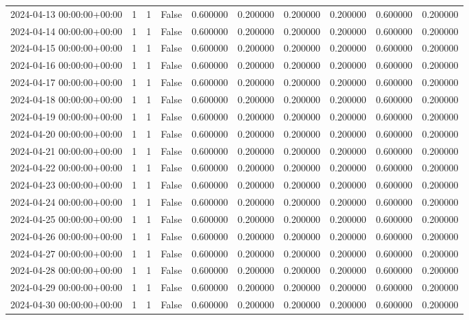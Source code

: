 \begin{tabular}{lrrrrrrrrr}
2024-04-13 00:00:00+00:00 & 1 & 1 & False & 0.600000 & 0.200000 & 0.200000 & 0.200000 & 0.600000 & 0.200000 \\
2024-04-14 00:00:00+00:00 & 1 & 1 & False & 0.600000 & 0.200000 & 0.200000 & 0.200000 & 0.600000 & 0.200000 \\
2024-04-15 00:00:00+00:00 & 1 & 1 & False & 0.600000 & 0.200000 & 0.200000 & 0.200000 & 0.600000 & 0.200000 \\
2024-04-16 00:00:00+00:00 & 1 & 1 & False & 0.600000 & 0.200000 & 0.200000 & 0.200000 & 0.600000 & 0.200000 \\
2024-04-17 00:00:00+00:00 & 1 & 1 & False & 0.600000 & 0.200000 & 0.200000 & 0.200000 & 0.600000 & 0.200000 \\
2024-04-18 00:00:00+00:00 & 1 & 1 & False & 0.600000 & 0.200000 & 0.200000 & 0.200000 & 0.600000 & 0.200000 \\
2024-04-19 00:00:00+00:00 & 1 & 1 & False & 0.600000 & 0.200000 & 0.200000 & 0.200000 & 0.600000 & 0.200000 \\
2024-04-20 00:00:00+00:00 & 1 & 1 & False & 0.600000 & 0.200000 & 0.200000 & 0.200000 & 0.600000 & 0.200000 \\
2024-04-21 00:00:00+00:00 & 1 & 1 & False & 0.600000 & 0.200000 & 0.200000 & 0.200000 & 0.600000 & 0.200000 \\
2024-04-22 00:00:00+00:00 & 1 & 1 & False & 0.600000 & 0.200000 & 0.200000 & 0.200000 & 0.600000 & 0.200000 \\
2024-04-23 00:00:00+00:00 & 1 & 1 & False & 0.600000 & 0.200000 & 0.200000 & 0.200000 & 0.600000 & 0.200000 \\
2024-04-24 00:00:00+00:00 & 1 & 1 & False & 0.600000 & 0.200000 & 0.200000 & 0.200000 & 0.600000 & 0.200000 \\
2024-04-25 00:00:00+00:00 & 1 & 1 & False & 0.600000 & 0.200000 & 0.200000 & 0.200000 & 0.600000 & 0.200000 \\
2024-04-26 00:00:00+00:00 & 1 & 1 & False & 0.600000 & 0.200000 & 0.200000 & 0.200000 & 0.600000 & 0.200000 \\
2024-04-27 00:00:00+00:00 & 1 & 1 & False & 0.600000 & 0.200000 & 0.200000 & 0.200000 & 0.600000 & 0.200000 \\
2024-04-28 00:00:00+00:00 & 1 & 1 & False & 0.600000 & 0.200000 & 0.200000 & 0.200000 & 0.600000 & 0.200000 \\
2024-04-29 00:00:00+00:00 & 1 & 1 & False & 0.600000 & 0.200000 & 0.200000 & 0.200000 & 0.600000 & 0.200000 \\
2024-04-30 00:00:00+00:00 & 1 & 1 & False & 0.600000 & 0.200000 & 0.200000 & 0.200000 & 0.600000 & 0.200000 \\

\end{tabular}
